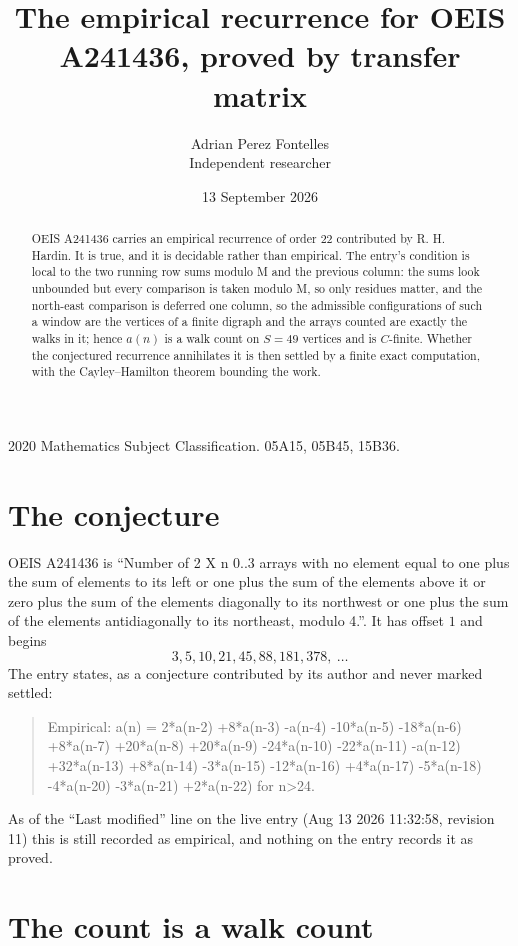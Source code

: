\documentclass[11pt,a4paper]{article}
\title{The empirical recurrence for OEIS A241436, proved by transfer matrix}
\author{Adrian Perez Fontelles\\ \small Independent researcher}
\date{13 September 2026}
\theoremstyle{plain}
\theoremstyle{definition}
\begin{document}
\maketitle

\begin{abstract}
OEIS A241436 carries an empirical recurrence of order $22$ contributed by R. H. Hardin. It is
true, and it is decidable rather than empirical. The entry's condition is local to the two running row sums modulo M and the previous column: the sums look unbounded but every comparison is taken modulo M, so only residues matter, and the north-east comparison is deferred one column, so
the admissible configurations of such a window are the vertices of a finite digraph and the
arrays counted are exactly the walks in it; hence $a(n)$ is a walk count on $S=49$ vertices
and is $C$-finite. Whether the conjectured recurrence annihilates it is then settled by a
finite exact computation, with the Cayley--Hamilton theorem bounding the work.
\end{abstract}

\noindent\small 2020 Mathematics Subject Classification. 05A15, 05B45, 15B36.\normalsize

\section{The conjecture}

OEIS A241436 is ``Number of 2 X n 0..3 arrays with no element equal to one plus the sum of elements to its left or one plus the sum of the elements above it or zero plus the sum of the elements diagonally to its northwest or one plus the sum of the elements antidiagonally to its northeast, modulo 4.''. It has offset $1$ and begins
\[
3, 5, 10, 21, 45, 88, 181, 378,\ \dots
\]
The entry states, as a conjecture contributed by its author and never marked settled:
\begin{quote}
Empirical: a(n) = 2*a(n-2) +8*a(n-3) -a(n-4) -10*a(n-5) -18*a(n-6) +8*a(n-7) +20*a(n-8) +20*a(n-9) -24*a(n-10) -22*a(n-11) -a(n-12) +32*a(n-13) +8*a(n-14) -3*a(n-15) -12*a(n-16) +4*a(n-17) -5*a(n-18) -4*a(n-20) -3*a(n-21) +2*a(n-22) for n>24.
\end{quote}
As of the ``Last modified'' line on the live entry (Aug 13 2026 11:32:58, revision 11) this is still
recorded as empirical, and nothing on the entry records it as proved.

\section{The count is a walk count}
\end{document}
